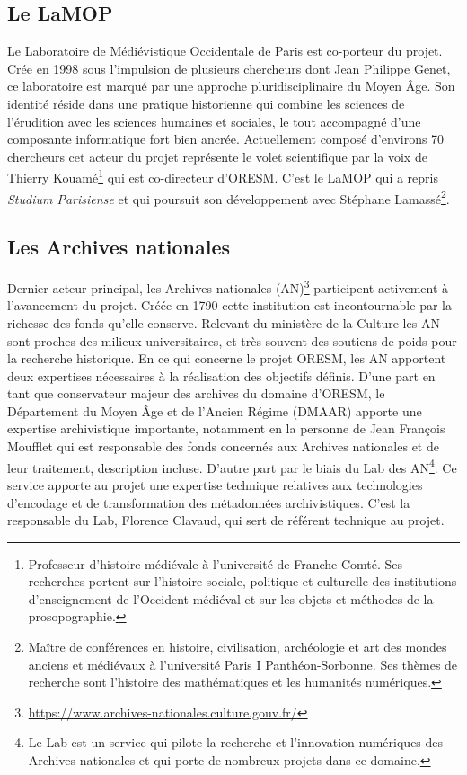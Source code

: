 \subsection{Le LaMOP}
Le Laboratoire de Médiévistique Occidentale de Paris est co-porteur du projet. Crée en 1998 sous l'impulsion de plusieurs chercheurs dont Jean Philippe Genet, ce laboratoire est marqué par une approche pluridisciplinaire du Moyen Âge. Son identité réside dans une pratique historienne qui combine les sciences de l’érudition avec les sciences humaines et sociales, le tout accompagné d’une composante informatique fort bien ancrée. Actuellement composé d'environs 70 chercheurs cet acteur du projet représente le volet scientifique par la voix de Thierry Kouamé\footnote{Professeur d’histoire médiévale à l’université de Franche-Comté. Ses recherches portent sur l’histoire sociale, politique et culturelle des institutions d’enseignement de l’Occident médiéval et sur les objets et méthodes de la prosopographie.} qui est co-directeur d'ORESM. C'est le LaMOP qui a repris \textit{Studium Parisiense} et qui poursuit son développement avec Stéphane Lamassé\footnote{Maître de conférences en histoire, civilisation, archéologie et art des mondes anciens et médiévaux à l’université Paris I Panthéon-Sorbonne. Ses thèmes de recherche sont l’histoire des mathématiques et les humanités numériques.}. 
\subsection{Les Archives nationales}
Dernier acteur principal, les Archives nationales (AN)\footnote{\href{https://www.archives-nationales.culture.gouv.fr/}{https://www.archives-nationales.culture.gouv.fr/}} participent activement à l'avancement du projet. Créée en 1790 cette institution est incontournable par la richesse des fonds qu'elle conserve. Relevant du ministère de la Culture les AN sont proches des milieux universitaires, et très souvent des soutiens de poids pour la recherche historique. En ce qui concerne le projet ORESM, les AN apportent deux expertises nécessaires à la réalisation des objectifs définis. D'une part en tant que conservateur majeur des archives du domaine d'ORESM, le Département du Moyen Âge et de l’Ancien Régime (DMAAR) apporte une expertise archivistique importante, notamment en la personne de Jean François Moufflet qui est responsable des fonds concernés aux Archives nationales et de leur traitement, description incluse. D'autre part par le biais du Lab des AN\footnote{Le Lab est un service qui pilote la recherche et l'innovation numériques des Archives nationales et qui porte de nombreux projets dans ce domaine.}. Ce service apporte au projet une expertise technique relatives aux technologies d'encodage et de transformation des métadonnées archivistiques. C'est la responsable du Lab, Florence Clavaud, qui sert de référent technique au projet.